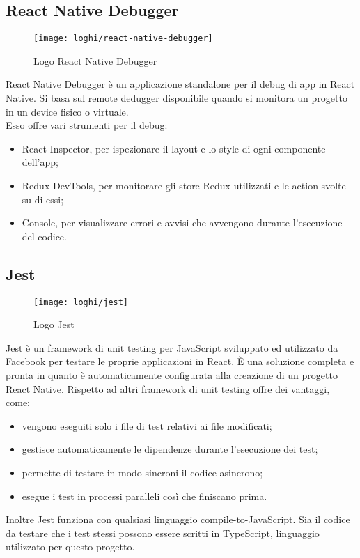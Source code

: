 \subsection{React Native Debugger}
\begin{figure}[H] 
	\centering
	\texttt{[image: loghi/react-native-debugger]}
	\caption{Logo React Native Debugger}
\end{figure}
React Native Debugger è un applicazione standalone per il debug di app in React 
Native. Si basa sul remote dedugger disponibile quando si monitora un progetto 
in un device fisico o virtuale.\\ Esso offre vari strumenti per il debug:
\begin{itemize}
	\item React Inspector, per ispezionare il layout e lo style di ogni componente dell'app;
	\item Redux DevTools, per monitorare gli store Redux utilizzati e le action svolte su di essi;
	\item Console, per visualizzare errori e avvisi che avvengono durante l'esecuzione del codice.
\end{itemize}

\subsection{Jest} \label{subsez:jest}
\begin{figure}[H] 
	\centering
	\texttt{[image: loghi/jest]}
	\caption{Logo Jest}
\end{figure}
Jest è un framework di unit testing per JavaScript sviluppato ed utilizzato da 
Facebook per testare le proprie applicazioni in React. È una soluzione completa 
e pronta in quanto è automaticamente configurata alla creazione di un progetto 
React Native.
Rispetto ad altri framework di unit testing offre dei vantaggi, come: 
\begin{itemize}
	\item vengono eseguiti solo i file di test relativi ai file modificati;
	\item gestisce automaticamente le dipendenze durante l'esecuzione dei test;
	\item permette di testare in modo sincroni il codice asincrono;
	\item esegue i test in processi paralleli così che finiscano prima.
\end{itemize}
Inoltre Jest funziona con qualsiasi linguaggio compile-to-JavaScript. 
Sia il codice da testare che i test stessi possono essere scritti in TypeScript, 
linguaggio utilizzato per questo progetto. 

